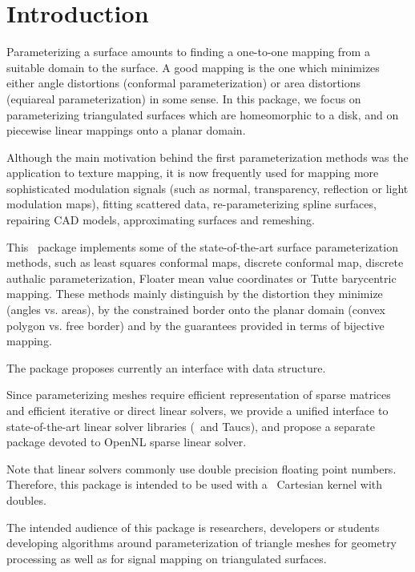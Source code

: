 \section{Introduction}

Parameterizing a surface amounts to finding a one-to-one mapping from
a suitable domain to the surface. A good mapping is the one which
minimizes either angle distortions (conformal parameterization) or
area distortions (equiareal parameterization) in some sense.  In this
package, we focus on parameterizing triangulated surfaces which are
homeomorphic to a disk, and on piecewise linear mappings onto a planar
domain.

Although the main motivation behind the first parameterization methods
was the application to texture mapping, it is now frequently used for
mapping more sophisticated modulation signals (such as normal,
transparency, reflection or light modulation maps), fitting scattered
data, re-parameterizing spline surfaces, repairing CAD models,
approximating surfaces and remeshing.

This \cgal\ package implements some of the state-of-the-art
surface parameterization methods, such as least squares conformal maps,
discrete conformal map, discrete authalic
parameterization, Floater mean value coordinates or Tutte barycentric
mapping. These methods mainly distinguish by the distortion they
minimize (angles vs. areas), by the constrained border onto the
planar domain (convex polygon vs. free border) and by the guarantees
provided in terms of bijective mapping.

The package proposes currently an interface with 
data structure.

Since parameterizing meshes require efficient representation of sparse
matrices and efficient iterative or direct linear solvers, we provide
a unified interface to state-of-the-art linear solver libraries (\eigen\ and {\sc Taucs}),
and propose a separate package devoted to OpenNL sparse
linear solver.

Note that linear solvers commonly use double precision floating point
numbers. Therefore, this package is intended to be used with a \cgal\
Cartesian kernel with doubles.

The intended audience of this package is researchers, developers or
students developing algorithms around parameterization of triangle
meshes for geometry processing as well as for signal mapping on
triangulated surfaces.


